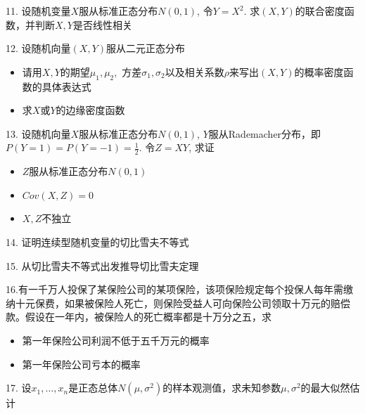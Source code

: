 \begin{frame}

11. 设随机变量$X$服从标准正态分布$N(0,1)$, 令$Y=X^2$. 求$(X,Y)$的联合密度函数，并判断$X,Y$是否线性相关

\vspace{1em}

12. 设随机向量$(X,Y)$服从二元正态分布
\begin{itemize}
\item[(1)] 请用$X,Y$的期望$\mu_1,\mu_2,$ 方差$\sigma_1,\sigma_2$以及相关系数$\rho$来写出$(X,Y)$的概率密度函数的具体表达式
\vspace{0.4em}
\item[(2)] 求$X$或$Y$的边缘密度函数
\end{itemize}

\vspace{1em}

13. 设随机向量$X$服从标准正态分布$N(0,1)$, $Y$服从Rademacher分布，即$P(Y = 1) = P(Y = -1) = \frac{1}{2}$. 令$Z = XY$, 求证
\begin{itemize}
\item[(1)] $Z$服从标准正态分布$N(0,1)$
\vspace{0.4em}
\item[(2)] $Cov(X,Z) = 0$
\vspace{0.4em}
\item[(2)] $X,Z$不独立
\end{itemize}

\end{frame}


\begin{frame}

14. 证明连续型随机变量的切比雪夫不等式

\vspace{1em}

15. 从切比雪夫不等式出发推导切比雪夫定理

\vspace{1em}

16.有一千万人投保了某保险公司的某项保险，该项保险规定每个投保人每年需缴纳十元保费，如果被保险人死亡，则保险受益人可向保险公司领取十万元的赔偿款。假设在一年内，被保险人的死亡概率都是十万分之五，求
\vspace{0.4em}
\begin{itemize}
\item[(1)] 第一年保险公司利润不低于五千万元的概率
\vspace{0.4em}
\item[(2)] 第一年保险公司亏本的概率
\end{itemize}

\vspace{1em}

17. 设$x_1,\ldots,x_n$是正态总体$N(\mu,\sigma^2)$的样本观测值，求未知参数$\mu,\sigma^2$的最大似然估计

\end{frame}

